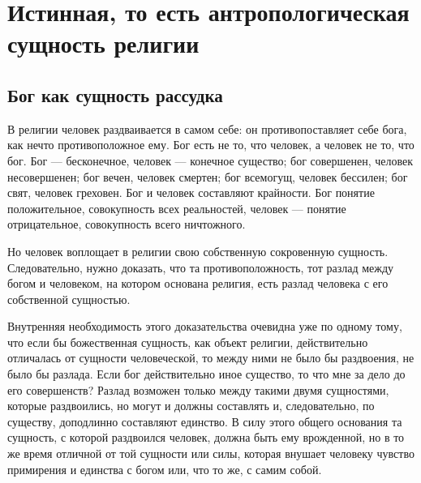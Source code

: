 \documentclass[12pt,oneside]{book}
\begin{document}
\part{Истинная, то есть антропологическая сущность религии}





\chapter{Бог как сущность рассудка}


В религии человек раздваивается в самом себе: он противопоставляет себе бога, как нечто противоположное ему. Бог есть не то, что человек, а человек не то, что бог. Бог --- бесконечное, человек --- конечное существо; бог совершенен, человек несовершенен; бог вечен, человек смертен; бог всемогущ, человек бессилен; бог свят, человек греховен. Бог и человек составляют крайности. Бог понятие положительное, совокупность всех реальностей, человек --- понятие отрицательное, совокупность всего ничтожного.

Но человек воплощает в религии свою собственную сокровенную сущность. Следовательно, нужно доказать, что та противоположность, тот разлад между богом и человеком, на котором основана религия, есть разлад человека с его собственной сущностью.

Внутренняя необходимость этого доказательства очевидна уже по одному тому, что если бы божественная сущность, как объект религии, действительно отличалась от сущности человеческой, то между ними не было бы раздвоения, не было бы разлада. Если бог действительно иное существо, то что мне за дело до его совершенств? Разлад возможен только между такими двумя сущностями, которые раздвоились, но могут и должны составлять и, следовательно, по существу, доподлинно составляют единство. В силу этого общего основания та сущность, с которой раздвоился человек, должна быть ему врожденной, но в то же время отличной от той сущности или силы, которая внушает человеку чувство примирения и единства с богом или, что то же, с самим собой.
\end{document}
